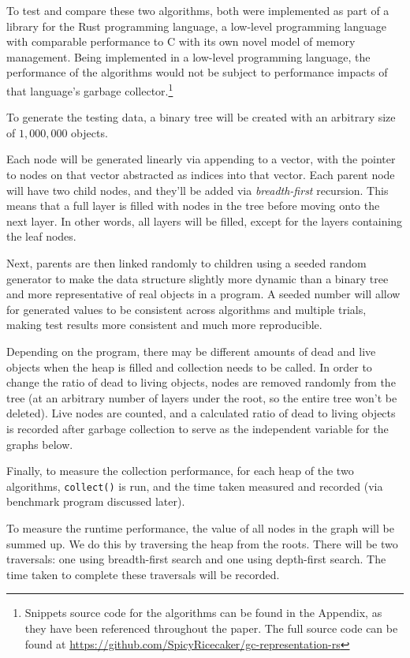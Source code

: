 \documentclass[index]{subfiles}
\begin{document}
To test and compare these two algorithms, both were implemented as part of a library for the Rust programming language, a low-level programming language with comparable performance to C with its own novel model of memory management. Being implemented in a low-level programming language, the performance of the algorithms would not be subject to performance impacts of that language's garbage collector.\footnote{Snippets source code for the algorithms can be found in the Appendix, as they have been referenced throughout the paper. The full source code can be found at \href{https://github.com/SpicyRicecaker/gc-representation-rs}{https://github.com/SpicyRicecaker/gc-representation-rs}}

To generate the testing data, a binary tree will be created with an arbitrary size of \(1,000,000\) objects.

Each node will be generated linearly via appending to a vector, with the pointer to nodes on that vector abstracted as indices into that vector. Each parent node will have two child nodes, and they'll be added via \textit{breadth-first} recursion. This means that a full layer is filled with nodes in the tree before moving onto the next layer. In other words, all layers will be filled, except for the layers containing the leaf nodes.

Next, parents are then linked randomly to children using a seeded random generator to make the data structure slightly more dynamic than a binary tree and more representative of real objects in a program. A seeded number will allow for generated values to be consistent across algorithms and multiple trials, making test results more consistent and much more reproducible.

Depending on the program, there may be different amounts of dead and live objects when the heap is filled and collection needs to be called. In order to change the ratio of dead to living objects, nodes are removed randomly from the tree (at an arbitrary number of layers under the root, so the entire tree won't be deleted). Live nodes are counted, and a calculated ratio of dead to living objects is recorded after garbage collection to serve as the independent variable for the graphs below. 

Finally, to measure the collection performance, for each heap of the two algorithms, \verb+collect()+ is run, and the time taken measured and recorded (via benchmark program discussed later).

To measure the runtime performance, the value of all nodes in the graph will be summed up. We do this by traversing the heap from the roots. There will be two traversals: one using breadth-first search and one using depth-first search. The time taken to complete these traversals will be recorded.
\end{document}
